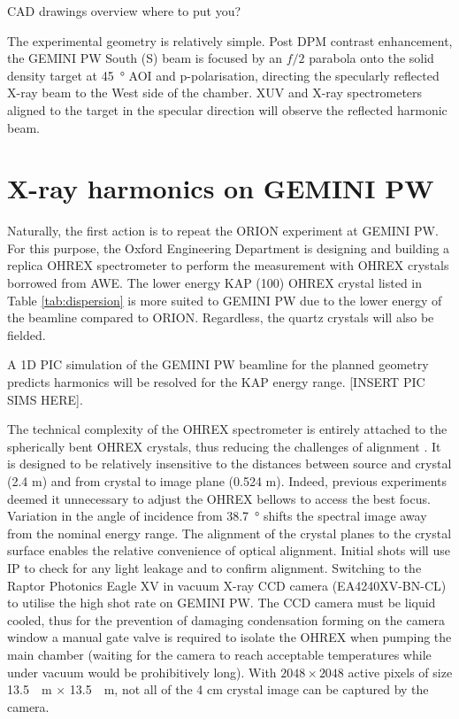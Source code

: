 

CAD drawings overview where to put you?

The experimental geometry is relatively simple. Post \ac{DPM} contrast enhancement, the GEMINI PW South (S) beam is focused by an $f/2$ parabola onto the solid density target at \qty{45}{\degree} \ac{AOI} and p-polarisation, directing the specularly reflected X-ray beam to the West side of the chamber. XUV and X-ray spectrometers aligned to the target in the specular direction will observe the reflected harmonic beam.

\section{X-ray harmonics on GEMINI PW}
Naturally, the first action is to repeat the ORION experiment at GEMINI PW. For this purpose, the Oxford Engineering Department is designing and building a replica OHREX spectrometer to perform the measurement with OHREX crystals borrowed from AWE. The lower energy KAP (100) OHREX crystal listed in Table \ref{tab:dispersion} is more suited to GEMINI PW due to the lower energy of the beamline compared to ORION. Regardless, the quartz crystals will also be fielded. 

A 1D PIC simulation of the GEMINI PW beamline for the planned geometry predicts harmonics will be resolved for the KAP energy range.
[INSERT PIC SIMS HERE].


The technical complexity of the OHREX spectrometer is entirely attached to the spherically bent OHREX crystals, thus reducing the challenges of alignment \cite{beiersdorferLineshapeSpectroscopyVery2016}. It is designed to be relatively insensitive to the distances between source and crystal (2.4 m) and from crystal to image plane (0.524 m). Indeed, previous experiments deemed it unnecessary to adjust the OHREX bellows to access the best focus. Variation in the angle of incidence from \qty{38.7}{\degree} shifts the spectral image away from the nominal energy range. 
The alignment of the crystal planes to the crystal surface enables the relative convenience of optical alignment. Initial shots will use IP to check for any light leakage and to confirm alignment. Switching to the Raptor Photonics Eagle XV in vacuum X-ray CCD camera (EA4240XV-BN-CL) \cite{EagleXVVacuum} to utilise the high shot rate on GEMINI PW. The CCD camera must be liquid cooled, thus for the prevention of damaging condensation forming on the camera window a manual gate valve is required to isolate the OHREX when pumping the main chamber (waiting for the camera to reach acceptable temperatures while under vacuum would be prohibitively long). With $2048 \times 2048$ active pixels of size \qty{13.5}{\mu m} $\times$ \qty{13.5}{\mu m}, not all of the 4 cm crystal image can be captured by the camera.


